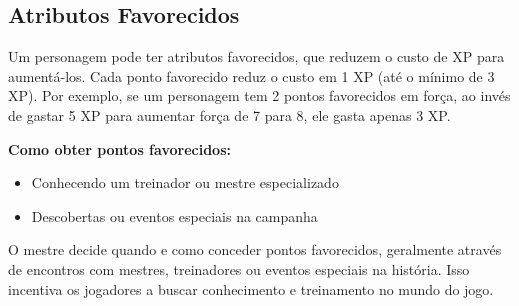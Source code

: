 \subsection{Atributos Favorecidos}

Um personagem pode ter atributos favorecidos, que reduzem o custo de XP para aumentá-los. Cada ponto favorecido reduz o custo em 1 XP (até o mínimo de 3 XP). Por exemplo, se um personagem tem 2 pontos favorecidos em força, ao invés de gastar 5 XP para aumentar força de 7 para 8, ele gasta apenas 3 XP.

\textbf{Como obter pontos favorecidos:}
\begin{itemize}
\item Conhecendo um treinador ou mestre especializado
\item Descobertas ou eventos especiais na campanha
\end{itemize}

O mestre decide quando e como conceder pontos favorecidos, geralmente através de encontros com mestres, treinadores ou eventos especiais na história. Isso incentiva os jogadores a buscar conhecimento e treinamento no mundo do jogo.




